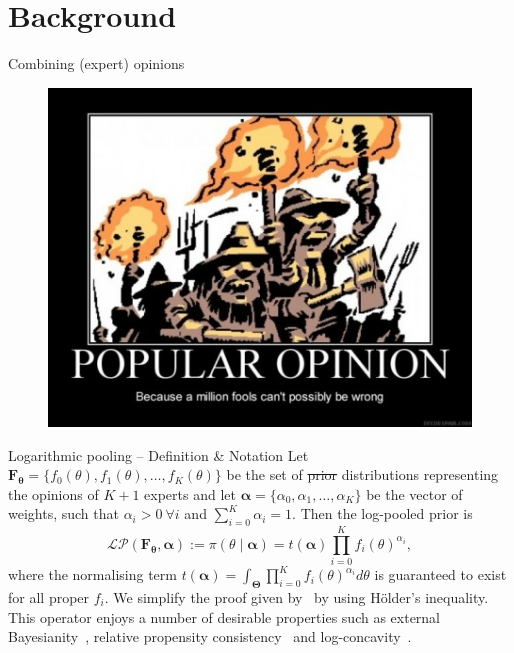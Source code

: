 \section*{Background}
\begin{frame}[t,plain]
\titlepage
\end{frame}
\begin{frame}{Combining (expert) opinions}
\begin{figure}
 \begin{center}
  \includegraphics[scale=0.5]{figures/Consensus.jpg}
 \end{center}
\end{figure}
\end{frame}
\begin{frame}{Logarithmic pooling -- Definition \& Notation}
Let $\mathbf{F_\theta} = \{f_0(\theta), f_1(\theta), \ldots, f_K(\theta)\}$ be the set of \sout{prior} distributions representing the opinions of $K+1$ experts and let $\boldsymbol\alpha =\{\alpha_0, \alpha_1, \ldots, \alpha_K \}$ be the vector of weights, such that $\alpha_i > 0\: \forall i$ and $\sum_{i=0}^K \alpha_i = 1$.
Then the log-pooled prior is
\begin{equation}
\label{eq:logpool}
 \mathcal{LP}(\mathbf{F_\theta}, \boldsymbol\alpha) := \pi(\theta \mid \boldsymbol\alpha) = t(\boldsymbol\alpha) \prod_{i=0}^K f_i(\theta)^{\alpha_i}, 
\end{equation}
where the normalising term $t(\boldsymbol\alpha) = \int_{\boldsymbol\Theta}\prod_{i=0}^K f_i(\theta)^{\alpha_i}d\theta$ is guaranteed to exist for all proper $f_i$.
We simplify the proof given by~\cite{genest1986A} by using H\"{o}lder's inequality.
This operator enjoys a number of desirable properties such as external Bayesianity~\citep{genest1986A}, relative propensity consistency~\citep{genest1984} and log-concavity~\citep{Carvalho2019}.
\end{frame}
